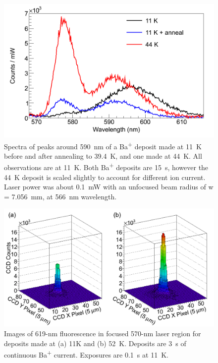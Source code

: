 \begin{figure} %
        \centering
                \includegraphics[width=.7\textwidth]{figures/spectra_temperature_conditions.png}
                \caption{Spectra of peaks around 590~nm of a Ba\textsuperscript{+} deposit made at 11~K before and after annealing to 39.4~K, and one made at 44~K.  All observations are at 11~K.  Both Ba\textsuperscript{+} deposits are 15~s, however the 44~K deposit is scaled slightly to account for different ion current.  Laser power was about 0.1~mW with an unfocused beam radius of w = 7.056~mm, at 566~nm wavelength.}
\label{fig:specTempConditions}
\end{figure}

\begin{figure} [h]
        \centering
                \includegraphics[width=.8\textwidth]{figures/619_deposit_temp.png}
                \caption{Images of 619-nm fluorescence in focused 570-nm laser region for deposits made at (a) 11K and (b) 52~K.  Deposits are 3~s of continuous Ba\textsuperscript{+} current.  Exposures are 0.1~s at 11~K.}
\label{fig:specTempConditions619}
\end{figure}

